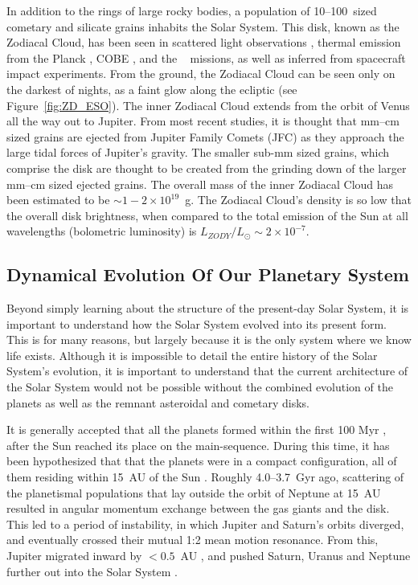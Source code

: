     
    In addition to the rings of large rocky bodies, a population of 10--100\micron\ sized cometary and silicate grains inhabits the Solar System. This disk, known as the Zodiacal Cloud, has been seen in scattered light observations \citep{Hahn2002}, thermal emission from the Planck \citep{Maris2006, Ade2014}, COBE \citep{Kelsall1998}, and the \iras\ \citep{Sykes1990} missions, as well as inferred from spacecraft impact experiments. From the ground, the Zodiacal Cloud can be seen only on the darkest of nights, as a faint glow along the ecliptic (see Figure~\ref{fig:ZD_ESO}). The inner Zodiacal Cloud extends from the orbit of Venus all the way out to Jupiter. From most recent studies, it is thought that mm--cm sized grains are ejected from Jupiter Family Comets (JFC) as they approach the large tidal forces of Jupiter's gravity. The smaller sub-mm sized grains, which comprise the disk are thought to be created from the grinding down of the larger mm--cm sized ejected grains. The overall mass of the inner Zodiacal Cloud has been estimated to be $\sim1-2\times10^{19}$~g\citep{Nesvorny2010}. The Zodiacal Cloud's density is so low that the overall disk brightness, when compared to the total emission of the Sun at all wavelengths (bolometric luminosity) is $L_{ZODY}/L_\odot \sim 2\times10^{-7}$\citep{Nesvorny2010}. 


    
    \subsection{Dynamical Evolution Of Our Planetary System}\label{sec:solar_system}
    
    Beyond simply learning about the structure of the present-day Solar System, it is important to understand how the Solar System evolved into its present form. This is for many reasons, but largely because it is the only system where we know life exists. Although it is impossible to detail the entire history of the Solar System's evolution, it is important to understand that the current architecture of the Solar System would not be possible without the combined evolution of the planets as well as the remnant asteroidal and cometary disks. 
    
    It is generally accepted that all the planets formed within the first 100 Myr \citep[upper limit based on the final accretion to create Earth,][]{Allegre2008}, after the Sun reached its place on the main-sequence. During this time, it has been hypothesized that that the planets were in a compact configuration, all of them residing within 15~AU of the Sun \citep{Batygin2010}. Roughly 4.0--3.7~Gyr ago, scattering of the planetismal populations that lay outside the orbit of Neptune at 15~AU resulted in angular momentum exchange between the gas giants and the disk. This led to a period of instability, in which Jupiter and Saturn's orbits diverged, and eventually crossed their mutual 1:2 mean motion resonance. From this, Jupiter migrated inward by $<0.5$~AU \citep{Morbidelli2010}, and pushed Saturn, Uranus and Neptune further out into the Solar System \citep{Tsiganis2005}. 
    
